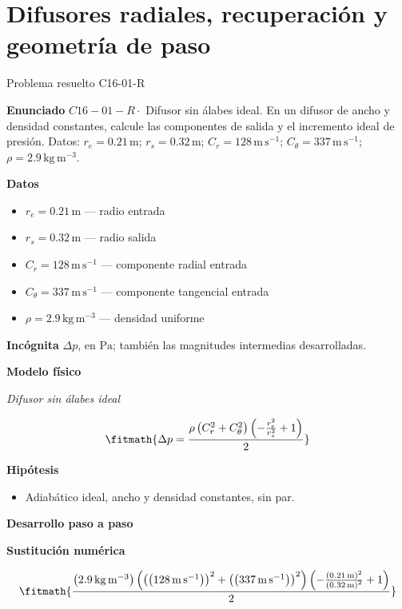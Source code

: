 \documentclass[10pt,openany]{book}
\begin{document}
\chapter{Difusores radiales, recuperación y geometría de paso}
\begin{studiumworked}{Problema resuelto C16-01-R}


\noindent\textbf{Enunciado}
\(C16-01-R \cdot\) Difusor sin álabes ideal. En un difusor de ancho y densidad constantes, calcule las componentes de salida y el incremento ideal de presión. Datos: \(r_e=0.21\, \mathrm{m}\); \(r_s=0.32\, \mathrm{m}\); \(C_r=128\, \mathrm{m}\,\mathrm{s}^{-1}\); \(C_\theta=337\, \mathrm{m}\,\mathrm{s}^{-1}\); \(\rho=2.9\, \mathrm{kg}\,\mathrm{m}^{-3}\).

\noindent\textbf{Datos}
\begin{itemize}
\item $r_e = 0.21\,\mathrm{m}$ — radio entrada
\item $r_s = 0.32\,\mathrm{m}$ — radio salida
\item $C_r = 128\,\mathrm{m}\,\mathrm{s}^{-1}$ — componente radial entrada
\item $C_\theta = 337\,\mathrm{m}\,\mathrm{s}^{-1}$ — componente tangencial entrada
\item $\rho = 2.9\,\mathrm{kg}\,\mathrm{m}^{-3}$ — densidad uniforme
\end{itemize}

\noindent\textbf{Incógnita}
$\Delta p$, en $\mathrm{Pa}$; también las magnitudes intermedias desarrolladas.

\noindent\textbf{Modelo físico}

\noindent\textit{Difusor sin álabes ideal}

\[
\fitmath{\Delta p=\frac{\rho \left(C_r^{2} + C_\theta^{2}\right) \left(- \frac{r_e^{2}}{r_s^{2}} + 1\right)}{2}}
\]

\noindent\textbf{Hipótesis}
\begin{itemize}
\item Adiabático ideal, ancho y densidad constantes, sin par.
\end{itemize}

\noindent\textbf{Desarrollo paso a paso}



\noindent\textbf{Sustitución numérica}

\[
\fitmath{\frac{\left(2.9\,\mathrm{kg}\,\mathrm{m}^{-3}\right) \left(\left(\left(128\,\mathrm{m}\,\mathrm{s}^{-1}\right)\right)^{2} + \left(\left(337\,\mathrm{m}\,\mathrm{s}^{-1}\right)\right)^{2}\right) \left(- \frac{\left(0.21\,\mathrm{m}\right)^{2}}{\left(0.32\,\mathrm{m}\right)^{2}} + 1\right)}{2}}
\]


\end{studiumworked}
\end{document}
